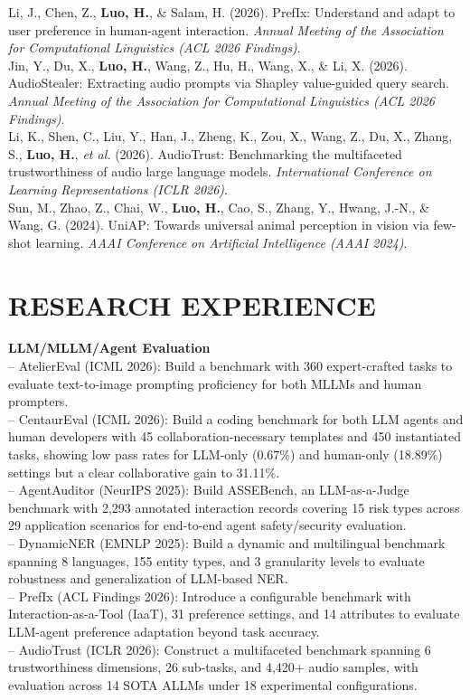 \documentclass[a4paper,9pt]{extarticle}
\begin{document}
\noindent
Li, J., Chen, Z., \textbf{Luo, H.}, \& Salam, H. (2026). PrefIx: Understand and adapt to user preference in human-agent interaction. \textit{Annual Meeting of the Association for Computational Linguistics (ACL 2026 Findings)}.\\[4pt]
\noindent
Jin, Y., Du, X., \textbf{Luo, H.}, Wang, Z., Hu, H., Wang, X., \& Li, X. (2026). AudioStealer: Extracting audio prompts via Shapley value-guided query search. \textit{Annual Meeting of the Association for Computational Linguistics (ACL 2026 Findings)}.\\[4pt]
\noindent
Li, K., Shen, C., Liu, Y., Han, J., Zheng, K., Zou, X., Wang, Z., Du, X., Zhang, S., \textbf{Luo, H.}, \textit{et al.} (2026). AudioTrust: Benchmarking the multifaceted trustworthiness of audio large language models. \textit{International Conference on Learning Representations (ICLR 2026)}.\\[4pt]
\noindent
Sun, M., Zhao, Z., Chai, W., \textbf{Luo, H.}, Cao, S., Zhang, Y., Hwang, J.-N., \& Wang, G. (2024). UniAP: Towards universal animal perception in vision via few-shot learning. \textit{AAAI Conference on Artificial Intelligence (AAAI 2024)}.\\[4pt]

\newpage
\section*{RESEARCH EXPERIENCE}
\noindent
\textbf{LLM/MLLM/Agent Evaluation}\\
-- AtelierEval (ICML 2026): Build a benchmark with 360 expert-crafted tasks to evaluate text-to-image prompting proficiency for both MLLMs and human prompters.\\
-- CentaurEval (ICML 2026): Build a coding benchmark for both LLM agents and human developers with 45 collaboration-necessary templates and 450 instantiated tasks, showing low pass rates for LLM-only (0.67\%) and human-only (18.89\%) settings but a clear collaborative gain to 31.11\%.\\
-- AgentAuditor (NeurIPS 2025): Build ASSEBench, an LLM-as-a-Judge benchmark with 2,293 annotated interaction records covering 15 risk types across 29 application scenarios for end-to-end agent safety/security evaluation.\\
-- DynamicNER (EMNLP 2025): Build a dynamic and multilingual benchmark spanning 8 languages, 155 entity types, and 3 granularity levels to evaluate robustness and generalization of LLM-based NER.\\
-- PrefIx (ACL Findings 2026): Introduce a configurable benchmark with Interaction-as-a-Tool (IaaT), 31 preference settings, and 14 attributes to evaluate LLM-agent preference adaptation beyond task accuracy.\\
-- AudioTrust (ICLR 2026): Construct a multifaceted benchmark spanning 6 trustworthiness dimensions, 26 sub-tasks, and 4,420+ audio samples, with evaluation across 14 SOTA ALLMs under 18 experimental configurations.\\[-2pt]
\end{document}
